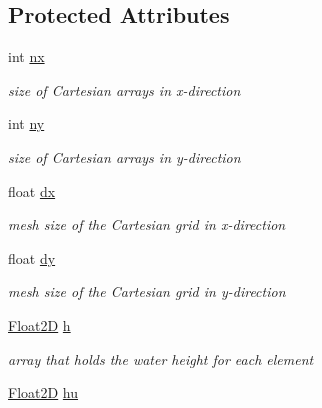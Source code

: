 \subsection*{Protected Attributes}
\begin{DoxyCompactItemize}
\item 
\hypertarget{classSWE__Block_a46ec0dc1157997bd255fb39924f1e2bb}{int \hyperlink{classSWE__Block_a46ec0dc1157997bd255fb39924f1e2bb}{nx}}\label{classSWE__Block_a46ec0dc1157997bd255fb39924f1e2bb}

\begin{DoxyCompactList}\small\item\em size of Cartesian arrays in x-\/direction \end{DoxyCompactList}\item 
\hypertarget{classSWE__Block_a3f139630d12423eb4bd7df3e45c7f5da}{int \hyperlink{classSWE__Block_a3f139630d12423eb4bd7df3e45c7f5da}{ny}}\label{classSWE__Block_a3f139630d12423eb4bd7df3e45c7f5da}

\begin{DoxyCompactList}\small\item\em size of Cartesian arrays in y-\/direction \end{DoxyCompactList}\item 
\hypertarget{classSWE__Block_af2262b1cce6834d939c5a2315dae49b1}{float \hyperlink{classSWE__Block_af2262b1cce6834d939c5a2315dae49b1}{dx}}\label{classSWE__Block_af2262b1cce6834d939c5a2315dae49b1}

\begin{DoxyCompactList}\small\item\em mesh size of the Cartesian grid in x-\/direction \end{DoxyCompactList}\item 
\hypertarget{classSWE__Block_a9feb988748d792bca0ca0508e43bd87f}{float \hyperlink{classSWE__Block_a9feb988748d792bca0ca0508e43bd87f}{dy}}\label{classSWE__Block_a9feb988748d792bca0ca0508e43bd87f}

\begin{DoxyCompactList}\small\item\em mesh size of the Cartesian grid in y-\/direction \end{DoxyCompactList}\item 
\hypertarget{classSWE__Block_a64a0f8f437f38b5f3b8ec5b4abdb864e}{\hyperlink{classFloat2D}{Float2\-D} \hyperlink{classSWE__Block_a64a0f8f437f38b5f3b8ec5b4abdb864e}{h}}\label{classSWE__Block_a64a0f8f437f38b5f3b8ec5b4abdb864e}

\begin{DoxyCompactList}\small\item\em array that holds the water height for each element \end{DoxyCompactList}\item 
\hypertarget{classSWE__Block_aec2c1278fdb23f083216d8d397f26060}{\hyperlink{classFloat2D}{Float2\-D} \hyperlink{classSWE__Block_aec2c1278fdb23f083216d8d397f26060}{hu}}\label{classSWE__Block_aec2c1278fdb23f083216d8d397f26060}


\end{DoxyCompactItemize}
